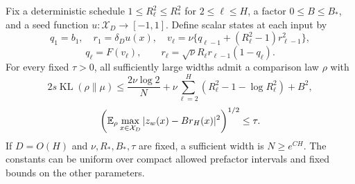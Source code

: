 \begin{lemma}
\label{lem:prefactor-finite-realization}
Fix a deterministic schedule $1\le R_\ell^2\le R_*^2$ for $2\le\ell\le H$, a factor $0\le B\le B_*$, and a seed function $u:\mathcal X_D\to[-1,1]$. Define scalar states at each input by
\[
 q_1=b_1,\quad r_1=\delta_Du(x),\quad
 v_\ell=\nu\{q_{\ell-1}+(R_\ell^2-1)r_{\ell-1}^2\},
\]
\[
 q_\ell=F(v_\ell),\qquad
 r_\ell=\sqrt\nu R_\ell r_{\ell-1}(1-q_\ell).
\]
For every fixed $\tau>0$, all sufficiently large widths admit a comparison law $\rho$ with
\[
 2s\operatorname{KL}(\rho\|\mu)
 \le\frac{2\nu\log2}{N}
      +\nu\sum_{\ell=2}^H(R_\ell^2-1-\log R_\ell^2)+B^2,
\]
\[
 \left(\mathbb E_\rho\max_{x\in\mathcal X_D}|z_w(x)-Br_H(x)|^2\right)^{1/2}
 \le\tau.
\]
If $D=O(H)$ and $\nu,R_*,B_*,\tau$ are fixed, a sufficient width is $N\ge e^{CH}$. The constants can be uniform over compact allowed prefactor intervals and fixed bounds on the other parameters.
\end{lemma}
